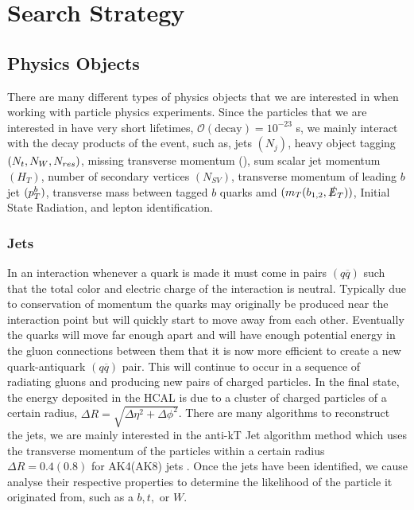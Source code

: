 \chapter{Search Strategy}
\label{ch:SearchStrategy}

\section{Physics Objects}\label{PhysObj}
There are many different types of physics objects that we are interested in when working with particle physics experiments. Since the particles that we are interested in have very short lifetimes, $\mathcal{O}(\text{decay})=10^{-23}$ s, we mainly interact with the decay products of the event, such as, jets $(N_j)$, heavy object tagging $(N_{t}, N_{W}, N_{res})$, missing transverse momentum (\met), sum scalar jet momentum $(H_T)$, number of secondary vertices $(N_{SV})$, transverse momentum of leading $b$ jet $(p_{T}^b)$, transverse mass between tagged $b$ quarks amd \met{} $(m_T(b_{1,2}, \slashed{E}_{T}))$, Initial State Radiation, and lepton identification.

\subsection{Jets}\label{Jets}
In an interaction whenever a quark is made it must come in pairs $(q\overline{q})$ such that the total color and electric charge of the interaction is neutral. Typically due to conservation of momentum the quarks may originally be produced near the interaction point but will quickly start to move away from each other. Eventually the quarks will move far enough apart and will have enough potential energy in the gluon connections between them that it is now more efficient to create a new quark-antiquark $(q\overline{q})$ pair. This will continue to occur in a sequence of radiating gluons and producing new pairs of charged particles. In the final state, the energy deposited in the HCAL is due to a cluster of charged particles of a certain radius, $\Delta R=\sqrt{\Delta\eta^2+\Delta\phi^2}$. There are many algorithms to reconstruct the jets, we are mainly interested in the anti-kT Jet algorithm \cite{cacciari_anti-ktjet_2008} method which uses the transverse momentum of the particles within a certain radius $\Delta R = 0.4 (0.8)$ for AK4(AK8) jets \cite{noauthor_jetid_nodate, noauthor_jec_nodate}. Once the jets have been identified, we cause analyse their respective properties to determine the likelihood of the particle it originated from, such as a $b, t, \text{ or } W$. 

